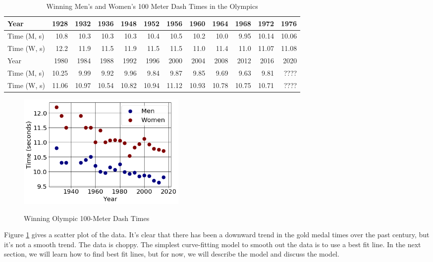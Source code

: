\begin{table}[h!]
\centering
\begin{tabular}{l*{11}{r}}
\toprule
Year        & 1928 & 1932 & 1936 & 1948 & 1952 & 1956 & 1960 & 1964 & 1968 & 1972  & 1976 \\
\midrule
Time (M, s) & 10.8 & 10.3 & 10.3 & 10.3 & 10.4 & 10.5 & 10.2 & 10.0 & 9.95 & 10.14 & 10.06 \\
\midrule
Time (W, s) & 12.2 & 11.9 & 11.5 & 11.9 & 11.5 & 11.5 & 11.0 & 11.4 & 11.0 & 11.07 & 11.08 \\
\bottomrule
Year        &  1980 & 1984 & 1988 & 1992 & 1996 & 2000 & 2004 & 2008 & 2012 & 2016 & 2020 \\
\midrule
Time (M, s) & 10.25 & 9.99 & 9.92 & 9.96 & 9.84 & 9.87 & 9.85 & 9.69 & 9.63 & 9.81 & ???? \\
\midrule
Time (W, s) & 11.06 & 10.97 & 10.54 & 10.82 & 10.94 & 11.12 & 10.93 & 10.78 & 10.75 & 10.71 & ???? \\
\bottomrule
\end{tabular}
\caption{Winning Men's and Women's 100 Meter Dash Times in the Olympics}
\label{tab:1-3-dash}
\end{table}

\begin{figure}[ht!]
    \centering
    \includegraphics[width=0.4\textwidth]{img/chap1/sec1-3/fig1-3-dash.png}\\
    \caption{Winning Olympic 100-Meter Dash Times}
    \label{fig:1-3-dash}
\end{figure}
Figure \ref{fig:1-3-dash} gives a scatter plot of the data. It's clear that there has been a downward trend in the gold medal times over the past century, but it's not a smooth trend. The data is choppy. The simplest curve-fitting model to smooth out the data is to use a best fit line. In the next section, we will learn how to find best fit lines, but for now, we will describe the model and discuss the model.

